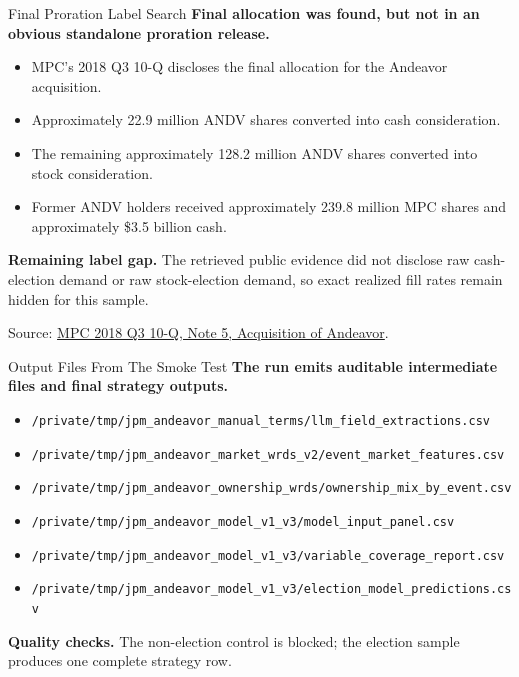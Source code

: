 \documentclass[aspectratio=169,11pt]{beamer}
\newcommand{\usd}[1]{\$#1}
\begin{document}
\begin{frame}{Final Proration Label Search}
\small
\textbf{Final allocation was found, but not in an obvious standalone proration release.}

\vspace{0.5em}
\begin{itemize}
  \item MPC's 2018 Q3 10-Q discloses the final allocation for the Andeavor acquisition.
  \item Approximately 22.9 million ANDV shares converted into cash consideration.
  \item The remaining approximately 128.2 million ANDV shares converted into stock consideration.
  \item Former ANDV holders received approximately 239.8 million MPC shares and approximately \usd{3.5} billion cash.
\end{itemize}

\vspace{0.5em}
\textbf{Remaining label gap.} The retrieved public evidence did not disclose raw cash-election demand or raw stock-election demand, so exact realized fill rates remain hidden for this sample.

\vspace{0.4em}
\scriptsize
Source: \href{https://www.sec.gov/Archives/edgar/data/1510295/000151029518000215/mpc-20180930x10q.htm}{MPC 2018 Q3 10-Q, Note 5, Acquisition of Andeavor}.
\end{frame}

\begin{frame}{Output Files From The Smoke Test}
\small
\textbf{The run emits auditable intermediate files and final strategy outputs.}

\vspace{0.5em}
\begin{itemize}
  \item \texttt{/private/tmp/jpm\_andeavor\_manual\_terms/llm\_field\_extractions.csv}
  \item \texttt{/private/tmp/jpm\_andeavor\_market\_wrds\_v2/event\_market\_features.csv}
  \item \texttt{/private/tmp/jpm\_andeavor\_ownership\_wrds/ownership\_mix\_by\_event.csv}
  \item \texttt{/private/tmp/jpm\_andeavor\_model\_v1\_v3/model\_input\_panel.csv}
  \item \texttt{/private/tmp/jpm\_andeavor\_model\_v1\_v3/variable\_coverage\_report.csv}
  \item \texttt{/private/tmp/jpm\_andeavor\_model\_v1\_v3/election\_model\_predictions.csv}
\end{itemize}

\vspace{0.5em}
\textbf{Quality checks.} The non-election control is blocked; the election sample produces one complete strategy row.
\end{frame}
\end{document}
